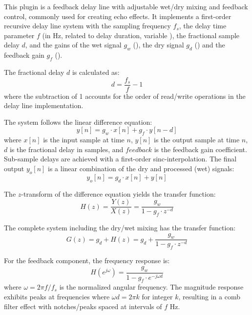 This plugin is a feedback delay line with adjustable wet/dry mixing
and feedback control, commonly used for creating echo effects. It
implements a first-order recursive delay line system with the sampling
frequency $f_s$, the delay time parameter $f$ (in Hz, related to delay
duration, variable ), the fractional sample delay $d$, and the
gains of the wet signal $g_w$ (), the dry signal $g_d$
() and the feedback gain $g_f$ ().

The fractional delay $d$ is calculated as:
\begin{equation}
  d = \frac{f_s}{f} - 1
\end{equation}
where the subtraction of 1 accounts for the order of read/write operations in the delay line implementation.

The system follows the linear difference equation:
\begin{equation}
  y[n] = g_w \cdot x[n] + g_f \cdot y[n - d]
\end{equation}
where $x[n]$ is the input sample at time $n$, $y[n]$ is the output
sample at time $n$, $d$ is the fractional delay in samples, and
$feedback$ is the feedback gain coefficient. Sub-sample delays are
achieved with a first-order sinc-interpolation. The final output
$y_o[n]$ is a linear combination of the dry and processed (wet)
signals:
\begin{equation}
  y_o[n] = g_d \cdot x[n] + y[n]
\end{equation}

The $z$-transform of the difference equation yields the transfer function:
\begin{equation}
  H(z) = \frac{Y(z)}{X(z)} = \frac{g_w}{1 - g_f \cdot z^{-d}}
\end{equation}

The complete system including the dry/wet mixing has the transfer function:
\begin{equation}
  G(z) = g_d + H(z) = g_d + \frac{g_w}{1 - g_f \cdot z^{-d}}
\end{equation}

For the feedback component, the frequency response is:
\begin{equation}
  H(e^{j\omega}) = \frac{g_w}{1 - g_f \cdot e^{-j\omega d}}
\end{equation}
where $\omega = 2\pi f / f_s$ is the normalized angular frequency.
The magnitude response exhibits peaks at frequencies where $\omega d =
2\pi k$ for integer $k$, resulting in a comb filter effect with
notches/peaks spaced at intervals of $f$ Hz.

